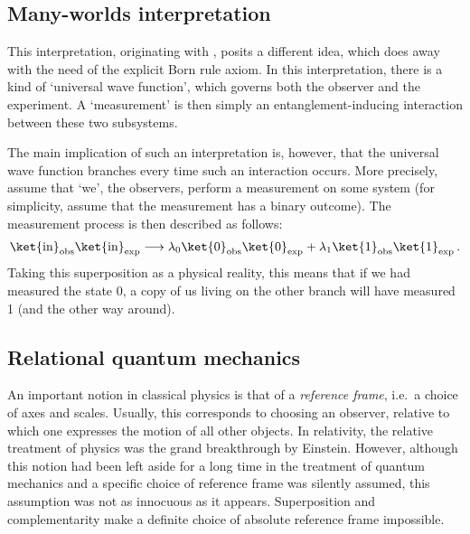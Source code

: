 
\subsection{Many-worlds interpretation}

    This interpretation, originating with , posits a different idea, which does away with the need of the explicit Born rule axiom. In this interpretation, there is a kind of `universal wave function', which governs both the observer and the experiment. A 
    `measurement' is then simply an entanglement-inducing interaction between these two subsystems.

    The main implication of such an interpretation is, however, that the universal wave function branches every time such an interaction occurs. More precisely, assume that `we', the observers, perform a measurement on some system (for simplicity, assume that the measurement has a binary outcome). The measurement process is then described as follows:
    \begin{gather}
        \ket{\text{in}}_{\text{obs}}\ket{\text{in}}_{\text{exp}}\longrightarrow\lambda_0\ket{0}_{\text{obs}}\ket{0}_{\text{exp}}+\lambda_1\ket{1}_{\text{obs}}\ket{1}_{\text{exp}}\,.
    \end{gather}
    Taking this superposition as a physical reality, this means that if we had measured the state 0, a copy of us living on the other branch will have measured 1 (and the other way around).


\subsection{Relational quantum mechanics}

    An important notion in classical physics is that of a \textit{reference frame}, i.e.~a choice of axes and scales. Usually, this corresponds to choosing an observer, relative to which one expresses the motion of all other objects. In relativity, the relative treatment of physics was the grand breakthrough by Einstein. However, although this notion had been left aside for a long time in the treatment of quantum mechanics and a specific choice of reference frame was silently assumed, this assumption was not as innocuous as it appears. Superposition and complementarity make a definite choice of absolute reference frame impossible.

